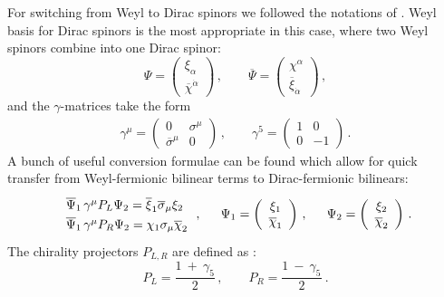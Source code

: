 \documentclass[12pt]{revtex4}
\begin{document}
For switching from Weyl to Dirac spinors we followed the notations of 
\cite{Martin:1997ns}.
Weyl basis for Dirac spinors is the most appropriate in this case,
where two Weyl spinors combine into one Dirac spinor:
\[
\Psi = 
\left (
\begin{array}{c}
  \xi_\alpha \\
\overline{\chi}^{\dot\alpha}
\end{array}
\right )\,,
\qquad
\overline{\Psi} = 
\left (
\begin{array}{c}
  \chi^\alpha \\
\overline{\xi}_{\dot\alpha}
\end{array}
\right )\,,
\]
and the $ \gamma $-matrices take the form
\begin{eqnarray*}
\gamma^\mu = 
\left ( 
\begin{array}{cc}
0                    &    \sigma^\mu \\
                     \overline{\sigma}^\mu   &         0    
\end{array}
\right )\,,
\qquad
\gamma^5 = 
\left ( 
\begin{array}{cc}
1      &         0  \\
                        0      &        -1    
\end{array}
\right )\,.
\end{eqnarray*}
A bunch of useful conversion formulae can be found
\cite{Martin:1997ns}
which allow for quick transfer from Weyl-fermionic
bilinear terms to Dirac-fermionic bilinears:
\begin{equation}
\begin{array}{ccc}
\renewcommand{\arraystretch}{1.3}
\begin{array}{l}
  \overline{\Psi}_1\, \gamma^\mu P_L \Psi_2 =
    \overline{\xi}_1 \overline{\sigma}_\mu \xi_2     \\
  \overline{\Psi}_1\, \gamma^\mu P_R \Psi_2 =
    \chi_1 \sigma_\mu \overline{\chi}_2
\end{array}\,,   
\renewcommand{\arraystretch}{1.0}
&
~~
\Psi_1 = \left (
         \begin{array}{c}
   \xi_1 \\
   \overline{\chi}_1
 \end{array}
 \right )
\,,
&
~~
\Psi_2 = \left (
         \begin{array}{c}
   \xi_2 \\
   \overline{\chi}_2
 \end{array}
 \right )\,.
\end{array}
\end{equation}
The chirality projectors $ P_{L,R} $ are defined as
\cite{Martin:1997ns}:
\[
P_L = \frac{ 1 ~+~ \gamma_5 }
                        { 2 }\,,
\qquad
P_R = \frac{ 1 ~-~ \gamma_5 }
                        { 2 }~.
\]
\end{document}
